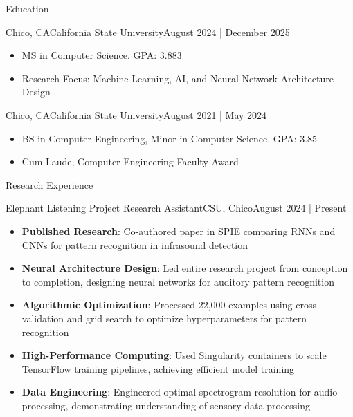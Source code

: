 \documentclass[]{mcdowellcv}
\begin{document}
\makeheader
      

\begin{cvsection}{Education}
	\begin{cvsubsection}{Chico, CA}{California State University}{August 2024 | December 2025}
		\begin{itemize}
			\item MS in Computer Science. GPA: 3.883
			\item Research Focus: Machine Learning, AI, and Neural Network Architecture Design
		\end{itemize}
	\end{cvsubsection}
	\begin{cvsubsection}{Chico, CA}{California State University}{August 2021 | May 2024}
		\begin{itemize}
			\item BS in Computer Engineering, Minor in Computer Science. GPA: 3.85
			\item Cum Laude, Computer Engineering Faculty Award
		\end{itemize}
	\end{cvsubsection}
\end{cvsection}

\begin{cvsection}{Research Experience}
	\begin{cvsubsection}{Elephant Listening Project Research Assistant}{CSU, Chico}{August 2024 | Present}
		\begin{itemize}
			\item \textbf{Published Research}: Co-authored paper in SPIE comparing RNNs and CNNs for pattern recognition in infrasound detection
			\item \textbf{Neural Architecture Design}: Led entire research project from conception to completion, designing neural networks for auditory pattern recognition
			\item \textbf{Algorithmic Optimization}: Processed 22,000 examples using cross-validation and grid search to optimize hyperparameters for pattern recognition
			\item \textbf{High-Performance Computing}: Used Singularity containers to scale TensorFlow training pipelines, achieving efficient model training
			\item \textbf{Data Engineering}: Engineered optimal spectrogram resolution for audio processing, demonstrating understanding of sensory data processing
		\end{itemize}
	\end{cvsubsection}
\end{cvsection}
\end{document}
